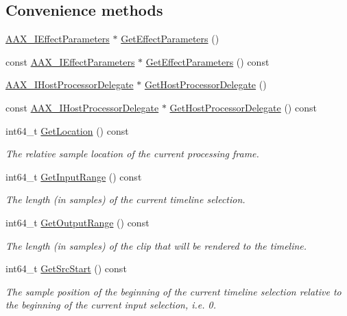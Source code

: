 \subsection*{Convenience methods}
\begin{DoxyCompactItemize}
\item 
\hyperlink{a00099}{A\+A\+X\+\_\+\+I\+Effect\+Parameters} $\ast$ \hyperlink{a00020_ac545926ac56fe6788aebda2a905a138f}{Get\+Effect\+Parameters} ()
\item 
const \hyperlink{a00099}{A\+A\+X\+\_\+\+I\+Effect\+Parameters} $\ast$ \hyperlink{a00020_a0b805c0c8eaa83efcd9eff6fec1697f1}{Get\+Effect\+Parameters} () const 
\item 
\hyperlink{a00102}{A\+A\+X\+\_\+\+I\+Host\+Processor\+Delegate} $\ast$ \hyperlink{a00020_aff1d956c341d1e06283a1bbb91240ebd}{Get\+Host\+Processor\+Delegate} ()
\item 
const \hyperlink{a00102}{A\+A\+X\+\_\+\+I\+Host\+Processor\+Delegate} $\ast$ \hyperlink{a00020_a0e78e9fe7255c15dbdb94fa87117cf4c}{Get\+Host\+Processor\+Delegate} () const 
\item 
int64\+\_\+t \hyperlink{a00020_a93a99af9ac58f111fcc045c84ab24093}{Get\+Location} () const 
\begin{DoxyCompactList}\small\item\em The relative sample location of the current processing frame. \end{DoxyCompactList}\item 
int64\+\_\+t \hyperlink{a00020_a2d145d968b944cbb9ca4256335249fb2}{Get\+Input\+Range} () const 
\begin{DoxyCompactList}\small\item\em The length (in samples) of the current timeline selection. \end{DoxyCompactList}\item 
int64\+\_\+t \hyperlink{a00020_a88f59a2655d17cd59f7fe771126d5f01}{Get\+Output\+Range} () const 
\begin{DoxyCompactList}\small\item\em The length (in samples) of the clip that will be rendered to the timeline. \end{DoxyCompactList}\item 
int64\+\_\+t \hyperlink{a00020_a6b46a3287c04a74195c3b4d095ff5dd1}{Get\+Src\+Start} () const 
\begin{DoxyCompactList}\small\item\em The sample position of the beginning of the current timeline selection relative to the beginning of the current input selection, i.\+e. 0. \end{DoxyCompactList}\item 

\end{DoxyCompactItemize}
